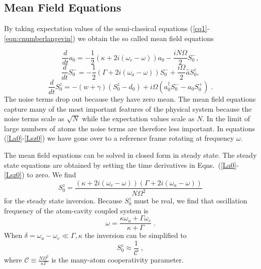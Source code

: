 \documentclass[aps,
twocolumn,
superscriptaddress,groupedaddress]{revtex4}
\begin{document}
\subsection{Mean Field Equations}

By taking expectation values of the semi-classical equations
(\ref{cq1}-\ref{eqn:cnumberlangevin}) we obtain the so called mean field
equations

\begin{equation}
\frac{d}{dt} a_0= -\frac{1}{2} (\kappa +2i(\omega_c-\omega)) a_0
-\frac{i N \Omega}{2} S_0^{-},
\label{La0}
\end{equation}
\begin{equation}
\frac{d}{dt} S_0^{-} =
-\frac{1}{2} \left(\Gamma +2 i (\omega_a-\omega) \right)  S_0^{-}
+\frac{i \Omega}{2} \hat{a} S_0^{z},
\end{equation}
\begin{equation}
\frac{d}{dt} S_0^{z} = -(w+\gamma)\left( S_0^{z} - d_0\right)
+i\Omega \left( a_0^{\dagger} S_0^{-} - a_0 S_0^{+} \right)\;.
\label{Lsz0}
\end{equation}
The noise terms drop out because they have zero mean.
The mean field equations capture many of the most important features of the
physical system because the noise terms scale as $\sqrt{N}$ while the
expectation values scale as $N$.  In the limit of large numbers of atoms
the noise terms are therefore less important.  In equations
(\ref{La0}-\ref{Lsz0}) we have gone over to a reference frame rotating
at frequency $\omega$.

The mean field equations can be solved in closed form in steady state.
The steady state equations are obtained by setting the time derivatives
in Eqns.~(\ref{La0}-\ref{Lsz0}) to zero.  We find
\begin{equation}
S_0^{z}=
\frac{(\kappa+2i(\omega_c-\omega))(\Gamma+2i(\omega_a-\omega))}{N\Omega^2}
\label{Sz01}
\end{equation}
for the steady state inversion.  Because $S_0^{z}$ must be real,
we find that oscillation frequency of the atom-cavity coupled system is
\begin{equation}
\omega = \frac{\kappa \omega_a + \Gamma \omega_c}{\kappa+\Gamma}\;.
\label{atomcavityfrequencycenter1}
\end{equation}
When $\delta = \omega_a-\omega_c \ll \Gamma,\kappa$ the inversion can be
simplified to
\begin{equation}
S_0^{z}\approx \frac{1}{\mathcal{C}}\;,
\end{equation}
where $\mathcal{C}\equiv \frac{N \Omega^2}{\kappa \Gamma}$ is the
many-atom cooperativity parameter.
\end{document}
